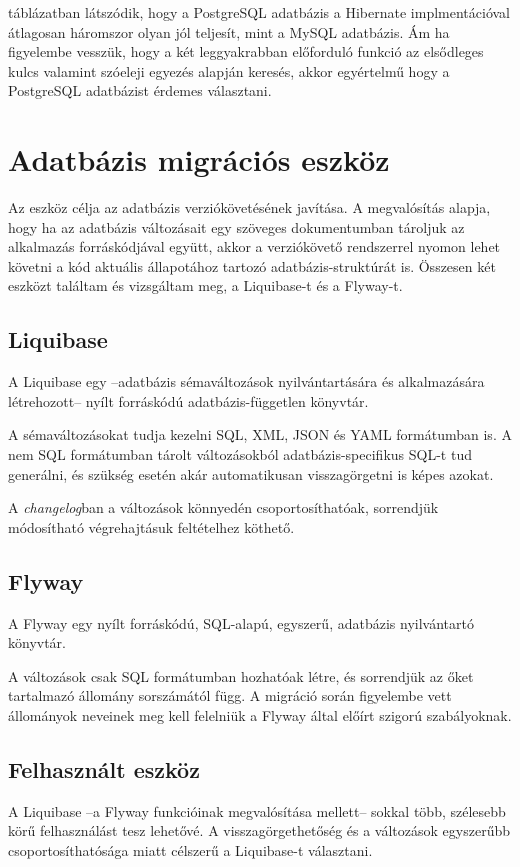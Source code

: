  táblázatban látszódik, hogy a PostgreSQL adatbázis a Hibernate implmentációval átlagosan háromszor olyan jól teljesít, mint a MySQL adatbázis. Ám ha figyelembe vesszük, hogy a két leggyakrabban előforduló funkció az elsődleges kulcs valamint szóeleji egyezés alapján keresés, akkor egyértelmű hogy a PostgreSQL adatbázist érdemes választani.



\section{Adatbázis migrációs eszköz}
Az eszköz célja az adatbázis verziókövetésének javítása. A megvalósítás alapja, hogy ha az adatbázis változásait egy szöveges dokumentumban tároljuk az alkalmazás forráskódjával együtt, akkor a verziókövető rendszerrel nyomon lehet követni a kód aktuális állapotához tartozó adatbázis-struktúrát is. Összesen két eszközt találtam és vizsgáltam meg, a Liquibase-t és a Flyway-t.

\subsection{Liquibase}
A Liquibase egy --adatbázis sémaváltozások nyilvántartására és alkalmazására létrehozott-- nyílt forráskódú adatbázis-független könyvtár.
	
A sémaváltozásokat tudja kezelni SQL, XML, JSON és YAML formátumban is. A nem SQL formátumban tárolt változásokból adatbázis-specifikus SQL-t tud generálni, és szükség esetén akár automatikusan visszagörgetni is képes azokat.

A \textit{changelog}ban a változások könnyedén csoportosíthatóak, sorrendjük módosítható végrehajtásuk feltételhez köthető.


\subsection{Flyway}
A Flyway egy nyílt forráskódú, SQL-alapú, egyszerű, adatbázis nyilvántartó könyvtár.

A változások csak SQL formátumban hozhatóak létre, és sorrendjük az őket tartalmazó állomány sorszámától függ. A migráció során figyelembe vett állományok neveinek meg kell felelniük a Flyway által előírt szigorú szabályoknak.


\subsection{Felhasznált eszköz}
A Liquibase --a Flyway funkcióinak megvalósítása mellett-- sokkal több, szélesebb körű felhasználást tesz lehetővé. A visszagörgethetőség és a változások egyszerűbb csoportosíthatósága miatt célszerű a Liquibase-t választani.




